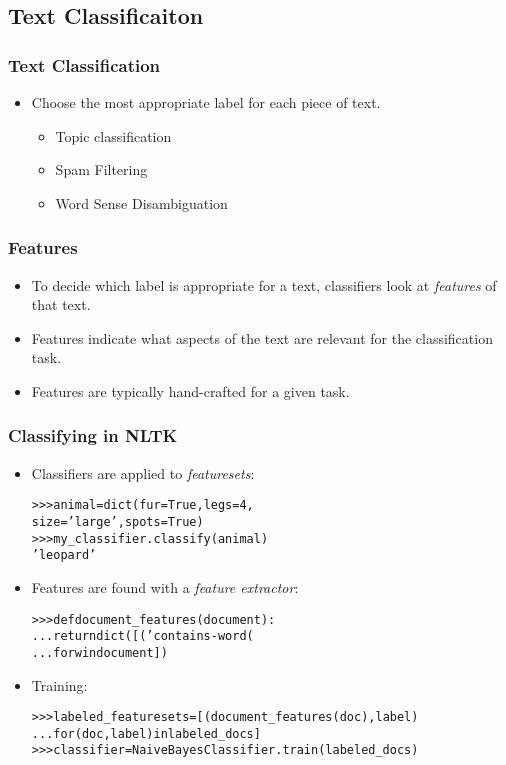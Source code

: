 \documentclass{beamer}             %
\begin{document}
\subsection{Text Classificaiton}

\begin{frame}
  \frametitle{Text Classification}
  \begin{itemize}
    \item Choose the most appropriate label for each piece of text.
    \begin{itemize}
      \item Topic classification
      \item Spam Filtering
      \item Word Sense Disambiguation
    \end{itemize}
  \end{itemize}
\end{frame}

\begin{frame}
  \frametitle{Features}
  \begin{itemize}
    \item To decide which label is appropriate for a text, 
      classifiers look at \emph{features} of that text.
    \item Features indicate what aspects of the text are
      relevant for the classification task.
    \item Features are typically hand-crafted for a given task.
  \end{itemize}
\end{frame}

\begin{frame}[fragile]
  \frametitle{Classifying in NLTK}
  \begin{itemize}
    \item Classifiers are applied to \emph{featuresets}:
\begin{alltt}\small
>>> animal = dict(fur=True, legs=4, 
                  size='large', spots=True)
>>> my_classifier.classify(animal)
'leopard'
\end{alltt}
    \item Features are found with a \emph{feature extractor}:
\begin{alltt}\small
>>> def document_features(document):
...     return dict([('contains-word(%s)'%w,True) 
...                  for w in document])
\end{alltt}
    \item Training:
\begin{alltt}\small
>>> labeled_featuresets = [(document_features(doc), label)
..       .                 for (doc, label) in labeled_docs]
>>> classifier = NaiveBayesClassifier.train(labeled_docs)
\end{alltt}

  \end{itemize}
\end{frame}
\end{document}
